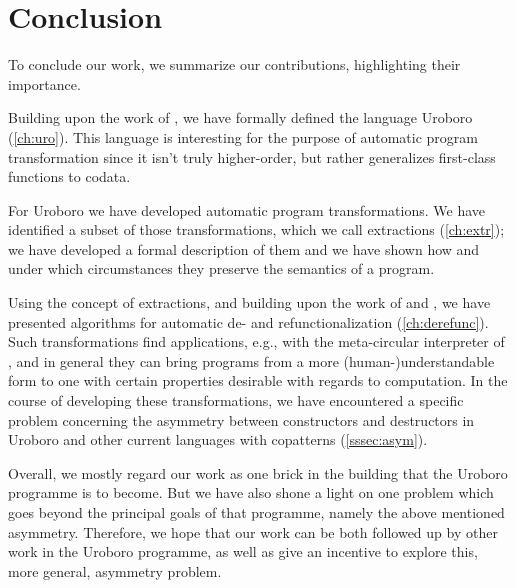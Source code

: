 \chapter{Conclusion}
\label{ch:concl}

To conclude our work, we summarize our contributions, highlighting their importance.

Building upon the work of \citet{rendel15automatic}, we have formally defined the language Uroboro (\autoref{ch:uro}). This language is interesting for the purpose of automatic program transformation since it isn't truly higher-order, but rather generalizes first-class functions to codata.

For Uroboro we have developed automatic program transformations. We have identified a subset of those transformations, which we call extractions (\autoref{ch:extr}); we have developed a formal description of them and we have shown how and under which circumstances they preserve the semantics of a program.

Using the concept of extractions, and building upon the work of \citet{rendel15automatic} and \citet{setzer14unnesting}, we have presented algorithms for automatic de- and refunctionalization (\autoref{ch:derefunc}). Such transformations find applications, e.g., with the meta-circular interpreter of \citet{reynolds72definitional}, and in general they can bring programs from a more (human-)understandable form to one with certain properties desirable with regards to computation. In the course of developing these transformations, we have encountered a specific problem concerning the asymmetry between constructors and destructors in Uroboro and other current languages with copatterns (\autoref{sssec:asym}).

Overall, we mostly regard our work as one brick in the building that the Uroboro programme is to become. But we have also shone a light on one problem which goes beyond the principal goals of that programme, namely the above mentioned asymmetry. Therefore, we hope that our work can be both followed up by other work in the Uroboro programme, as well as give an incentive to explore this, more general, asymmetry problem.